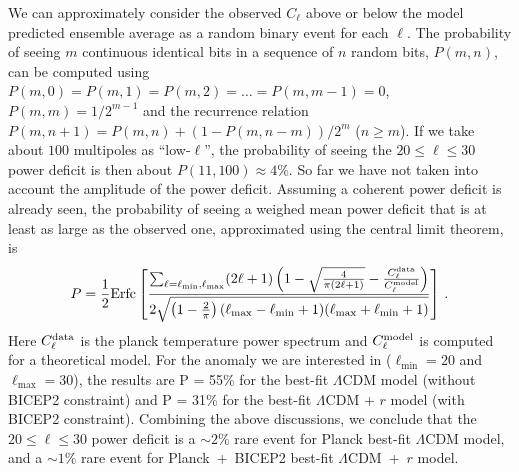 \documentclass[a4paper,11pt]{article}
\begin{document}
We can approximately consider the observed $C_\ell$ above or below the model predicted ensemble average as a random binary event for each $\ell$. The probability of seeing $m$ continuous identical bits in a sequence of $n$ random bits, $P(m, n)$, can be computed using $P(m, 0) = P(m, 1) = P(m, 2) = \ldots = P(m, m-1) = 0$, $P(m, m) = 1/2^{m-1}$ and the recurrence relation $P(m, n+1 ) = P(m, n) + (1-P(m, n-m))/2^m$ ($n\ge m$). If we take about $100$ multipoles as ``low-$\ell$'', the probability of seeing the $20\le \ell \le 30$ power deficit is then about $P(11, 100)\approx 4\%$. So far we have not taken into account the amplitude of the power deficit. Assuming a coherent power deficit is already seen, the probability of seeing a weighed mean power deficit that is at least as large as the observed one, approximated using the central limit theorem, is 
\begin{equation}
  P = \frac{1}{2}{\rm Erfc}\left[\frac{\sum_{\ell = \ell_{\min}, \ell_{\max}} (2\ell+1)\left(  1 - \sqrt{\frac{4}{\pi(2\ell+1)}} -  \frac{C_\ell^{\rm data}}{C_\ell^{\rm model}}\right)}{2\sqrt{\left(1-\frac{2}{\pi}\right)(\ell_{\max}-\ell_{\min}+1)(\ell_{\max}+\ell_{\min}+1)}}\right] \, .
\end{equation}
Here $C_\ell^{\rm data}$ is the planck temperature power spectrum and $C_\ell^{\rm model}$ is computed for a theoretical model. For the anomaly we are interested in ($\ell_{\min} = 20$ and $\ell_{\max}=30$), the results are P = 55\% for the best-fit $\Lambda$CDM model (without BICEP2 constraint) and P = 31\% for the best-fit $\Lambda$CDM + $r$ model (with BICEP2 constraint). Combining the above discussions, we conclude that the $20\le\ell\le 30$ power deficit is a $\sim 2\%$ rare event for Planck best-fit $\Lambda$CDM model, and a $\sim 1\%$ rare event for Planck~+~BICEP2 best-fit $\Lambda$CDM~+~$r$ model. 
\end{document}
